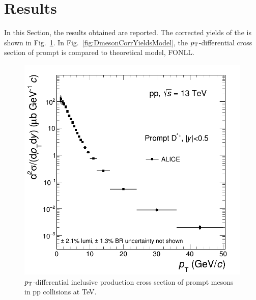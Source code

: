 \section{Results}
In this Section, the results obtained are reported. The corrected yields of the \Dstar is shown in Fig.~\ref{fig:DmesonCorrYields}. In Fig.~\ref{fig:DmesonCorrYieldsModel}, the $p_{\rm T}$-differential cross section of prompt \Dstar is compared to theoretical model, FONLL.


\begin{figure}[tb]
\begin{center}
\includegraphics[width=1\textwidth]{figures/Dstar/pp13TeV/cross-setion-pp13TeV.png}
\caption{$p_{\rm T}$-differential inclusive production cross section of prompt \Dstar mesons in pp collisions at  TeV.} 
\label{fig:DmesonCorrYields}
\end{center}
\end{figure}



